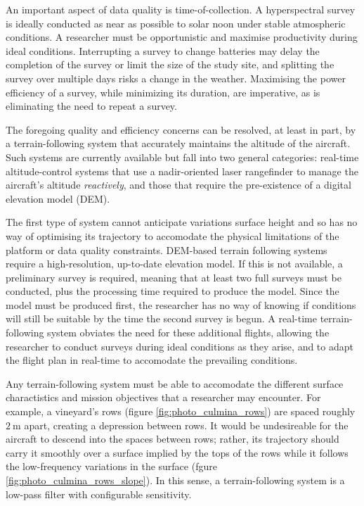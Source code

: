 \documentclass[10pt]{article}
\begin{document}
An important aspect of data quality is time-of-collection. A hyperspectral survey is ideally conducted as near as possible to solar noon under stable atmospheric conditions. A researcher must be opportunistic and maximise productivity during ideal conditions. Interrupting a survey to change batteries may delay the completion of the survey or limit the size of the study site, and splitting the survey over multiple days risks a change in the weather. Maximising the power efficiency of a survey, while minimizing its duration, are imperative, as is eliminating the need to repeat a survey.

The foregoing quality and efficiency concerns can be resolved, at least in part, by a terrain-following system that accurately maintains the altitude of the aircraft. Such systems are currently available but fall into two general categories: real-time altitude-control systems that use a nadir-oriented laser rangefinder to manage the aircraft's altitude \emph{reactively}, and those that require the pre-existence of a digital elevation model (DEM).

The first type of system cannot anticipate variations surface height and so has no way of optimising its trajectory to accomodate the physical limitations of the platform or data quality constraints. DEM-based terrain following systems require a high-resolution, up-to-date elevation model. If this is not available, a preliminary survey is required, meaning that at least two full surveys must be conducted, plus the processing time required to produce the model. Since the model must be produced first, the researcher has no way of knowing if conditions will still be suitable by the time the second survey is begun. A real-time terrain-following system obviates the need for these additional flights, allowing the researcher to conduct surveys during ideal conditions as they arise, and to adapt the flight plan in real-time to accomodate the prevailing conditions.

Any terrain-following system must be able to accomodate the different surface charactistics and mission objectives that a researcher may encounter. For example, a vineyard's rows (figure \ref{fig:photo_culmina_rows}) are spaced roughly $\SI{2}\m$ apart, creating a depression between rows. It would be undesireable for the aircraft to descend into the spaces between rows; rather, its trajectory should carry it smoothly over a surface implied by the tops of the rows while it follows the low-frequency variations in the surface (fgure \ref{fig:photo_culmina_rows_slope}). In this sense, a terrain-following system is a low-pass filter with configurable sensitivity.
\end{document}
